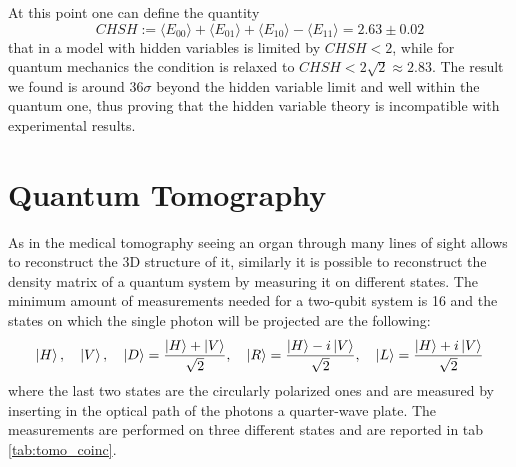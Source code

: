 \documentclass[a4paper, 11pt]{article}
\begin{document}
    At this point one can define the quantity
    \begin{equation*}
      CHSH := \langle E_{00} \rangle + \langle E_{01} \rangle + \langle E_{10} \rangle - \langle E_{11} \rangle = 2.63 \pm 0.02
    \end{equation*}
    that in a model with hidden variables is limited by $CHSH < 2$, while for quantum mechanics the condition is relaxed to $CHSH < 2\sqrt{2} \approx 2.83$. The result we found is around $36\sigma$ beyond the hidden variable limit and well within the quantum one, thus proving that the hidden variable theory is incompatible with experimental results.


  \section{Quantum Tomography}
    As in the medical tomography seeing an organ through many lines of sight allows to reconstruct the 3D structure of it, similarly it is possible to reconstruct the density matrix of a quantum system by measuring it on different states. The minimum amount of measurements needed for a two-qubit system is 16 and the states on which the single photon will be projected are the following:
    \begin{gather*}
      \ket{H}, \quad \ket{V}, \quad \ket{D} = \frac{\ket{H} + \ket{V}}{\sqrt{2}},
      \quad \ket{R}  = \frac{\ket{H} -i \ket{V}}{\sqrt{2}}, \quad \ket{L}  = \frac{\ket{H} +i \ket{V}}{\sqrt{2}}
    \end{gather*}
    where the last two states are the circularly polarized ones and are measured by inserting in the optical path of the photons a quarter-wave plate.
    The measurements are performed on three different states and are reported in tab \ref{tab:tomo_coinc}.
\end{document}
